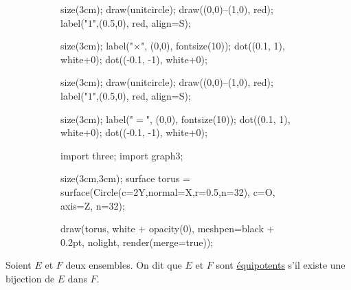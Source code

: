 \begin{exm}
	\begin{figure}[H]
		\centering
		\begin{subfigure}[b]{3cm}
			\centering
			\begin{asy}
				size(3cm);
				draw(unitcircle);
				draw((0,0)--(1,0), red);
				label("$1$",(0.5,0), red, align=S);
			\end{asy}
		\end{subfigure}
		\begin{subfigure}[b]{1cm}
			\centering
			\begin{asy}
				size(3cm);
				label("$\times$", (0,0), fontsize(10));
				dot((0.1, 1), white+0);
				dot((-0.1, -1), white+0);
			\end{asy}
		\end{subfigure}
		\begin{subfigure}[b]{3cm}
			\centering
			\begin{asy}
				size(3cm);
				draw(unitcircle);
				draw((0,0)--(1,0), red);
				label("$1$",(0.5,0), red, align=S);
			\end{asy}
		\end{subfigure}
		\begin{subfigure}[b]{1cm}
			\centering
			\begin{asy}
				size(3cm);
				label("$=$", (0,0), fontsize(10));
				dot((0.1, 1), white+0);
				dot((-0.1, -1), white+0);
			\end{asy}
		\end{subfigure}
		\begin{subfigure}[b]{3cm}
			\centering
			\begin{asy}
				import three;
				import graph3;

				size(3cm,3cm);
				surface torus = surface(Circle(c=2Y,normal=X,r=0.5,n=32), c=O, axis=Z, n=32);

				draw(torus, white + opacity(0), meshpen=black + 0.2pt, nolight, render(merge=true));
			\end{asy}
			\vspace{0.7cm}
		\end{subfigure}
	\end{figure}
\end{exm}

\begin{defn}
	Soient $E$ et $F$ deux ensembles. On dit que $E$ et $F$ sont \underline{équipotents} s'il existe une bijection de $E$ dans $F$.
\end{defn}

